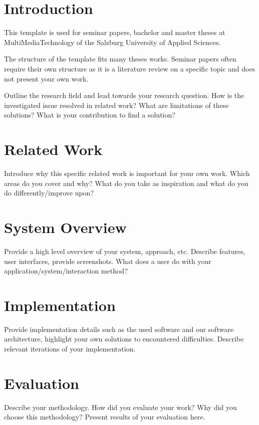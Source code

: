 

\section{Introduction}
\label{section:Introduction}

This template is used for seminar papers, bachelor and master theses at MultiMediaTechnology of the Salzburg University of Applied Sciences. 

The structure of the template fits many theses works. Seminar papers often require their own structure as it is a literature review on a specific topic and does not present your own work.

Outline the research field and lead towards your research question. How is the investigated issue resolved in related work? What are limitations of these solutions? What is your contribution to find a solution?

\section{Related Work}
Introduce why this specific related work is important for your own work. Which areas do you cover and why? What do you take as inspiration and what do you do differently/improve upon? 

\section{System Overview}
Provide a high level overview of your system, approach, etc. 
Describe features, user interfaces, provide screenshots.
What does a user do with your application/system/interaction method?

\section{Implementation}
Provide implementation details such as the used software and our software architecture, highlight your own solutions to encountered difficulties. Describe relevant iterations of your implementation.

\section{Evaluation}
Describe your methodology. How did you evaluate your work? Why did you choose this methodology? Present results of your evaluation here.

